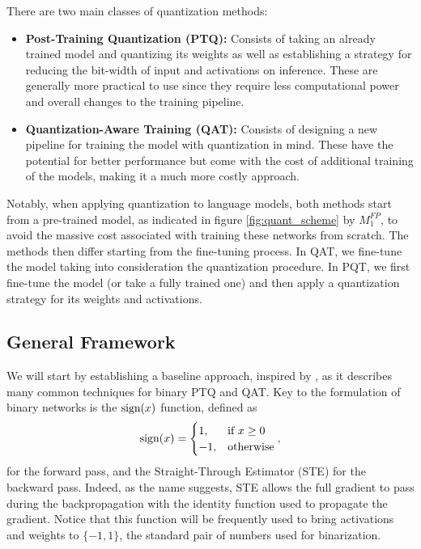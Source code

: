 \newpage
There are two main classes of quantization methods: 
\begin{itemize}
    \item \textbf{Post-Training Quantization (PTQ): } Consists of taking an already trained model and quantizing its weights as well as establishing a strategy for reducing the bit-width of input and activations on inference. These are generally more practical to use since they require less computational power and overall changes to the training pipeline.

    \item \textbf{Quantization-Aware Training (QAT): } Consists of designing a new pipeline for training the model with quantization in mind. These have the potential for better performance but come with the cost of additional training of the models, making it a much more costly approach.    
\end{itemize}

Notably, when applying quantization to language models, both methods start from a pre-trained model, as indicated in figure \ref{fig:quant_scheme} by $M_1^{FP}$, to avoid the massive cost associated with training these networks from scratch. The methods then differ starting from the fine-tuning process. In QAT, we fine-tune the model taking into consideration the quantization procedure. In PQT, we first fine-tune the model (or take a fully trained one) and then apply a quantization strategy for its weights and activations.

\subsection{General Framework}

We will start by establishing a baseline approach, inspired by \cite{Qin2022bibert}, as it describes many common techniques for binary PTQ and QAT. Key to the formulation of binary networks is the $\text{sign}(x)$ function, defined as
\begin{equation}
    \text{sign}(x) = \begin{cases}
        1, & \text{if } x \geq 0 \\
        -1, & \text{otherwise}
    \end{cases},
\end{equation}
for the forward pass, and the Straight-Through Estimator (STE)\cite{bengio2013estimating} for the backward pass. Indeed, as the name suggests, STE allows the full gradient to pass during the backpropagation with the identity function used to propagate the gradient. Notice that this function will be frequently used to bring activations and weights to $\{-1, 1\}$, the standard pair of numbers used for binarization.

